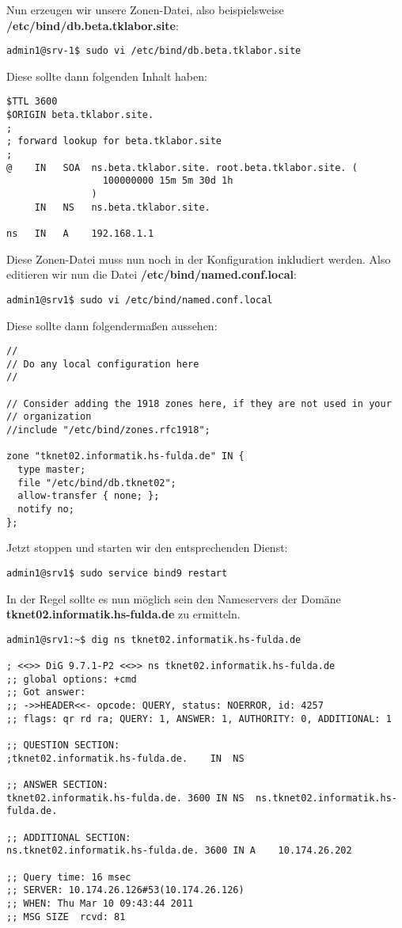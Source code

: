 Nun erzeugen wir unsere Zonen-Datei, also beispielsweise
\textbf{/etc/bind/db.beta.tklabor.site}:
\begin{lstlisting}
admin1@srv-1$ sudo vi /etc/bind/db.beta.tklabor.site
\end{lstlisting}
Diese sollte dann folgenden Inhalt haben:
\begin{lstlisting}
$TTL 3600
$ORIGIN beta.tklabor.site.
;
; forward lookup for beta.tklabor.site
;
@    IN   SOA  ns.beta.tklabor.site. root.beta.tklabor.site. ( 
                 100000000 15m 5m 30d 1h 
               )
     IN   NS   ns.beta.tklabor.site.

ns   IN   A    192.168.1.1
\end{lstlisting}
\normalsize Diese Zonen-Datei muss nun noch in der Konfiguration inkludiert werden. Also editieren wir nun die Datei \textbf{/etc/bind/named.conf.local}:
\begin{lstlisting}
admin1@srv1$ sudo vi /etc/bind/named.conf.local
\end{lstlisting}
Diese sollte dann folgendermaßen aussehen:
\begin{lstlisting}
//
// Do any local configuration here
//

// Consider adding the 1918 zones here, if they are not used in your
// organization
//include "/etc/bind/zones.rfc1918";

zone "tknet02.informatik.hs-fulda.de" IN {
  type master;
  file "/etc/bind/db.tknet02";
  allow-transfer { none; };
  notify no;
};
\end{lstlisting}
Jetzt stoppen und starten wir den entsprechenden Dienst:
\begin{lstlisting}
admin1@srv1$ sudo service bind9 restart
\end{lstlisting}

In der Regel sollte es nun möglich sein den Nameservers der Domäne \\ \textbf{tknet02.informatik.hs-fulda.de} zu ermitteln.

\begin{lstlisting}
admin1@srv1:~$ dig ns tknet02.informatik.hs-fulda.de

; <<>> DiG 9.7.1-P2 <<>> ns tknet02.informatik.hs-fulda.de
;; global options: +cmd
;; Got answer:
;; ->>HEADER<<- opcode: QUERY, status: NOERROR, id: 4257
;; flags: qr rd ra; QUERY: 1, ANSWER: 1, AUTHORITY: 0, ADDITIONAL: 1

;; QUESTION SECTION:
;tknet02.informatik.hs-fulda.de.	IN	NS

;; ANSWER SECTION:
tknet02.informatik.hs-fulda.de.	3600 IN	NS	ns.tknet02.informatik.hs-fulda.de.

;; ADDITIONAL SECTION:
ns.tknet02.informatik.hs-fulda.de. 3600	IN A	10.174.26.202

;; Query time: 16 msec
;; SERVER: 10.174.26.126#53(10.174.26.126)
;; WHEN: Thu Mar 10 09:43:44 2011
;; MSG SIZE  rcvd: 81
\end{lstlisting}
